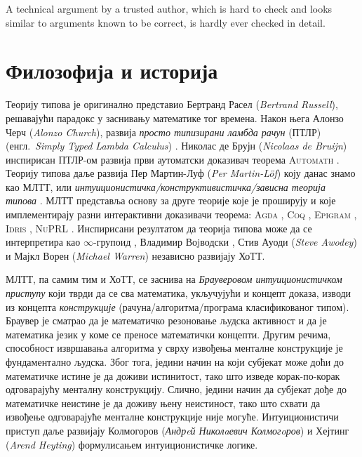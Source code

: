 \documentclass[12pt,oneside]{memoir}
\begin{document}
\begin{displayquote}
    A technical argument by a trusted author, which is hard to check and looks similar to arguments known to be correct, is hardly ever checked in detail.
\end{displayquote}

\section{Филозофија и историја}

Теорију типова је оригинално представио Бертранд Расел \cite{rus08} (\emph{Bertrand Russell}), решавајући парадокс у заснивању математике тог времена. Након њега Алонзо Черч (\emph{Alonzo Church}), развија \emph{просто типизирани ламбда рачун} (ПТЛР) (енгл.~\emph{Simply Typed Lambda Calculus}) \cite{crc40, crc41}. Николас де Брујн (\emph{Nicolaas de Bruijn}) инспирисан ПТЛР-ом развија први аутоматски доказивач теорема \textsc{Automath} \cite{automath}. Теорију типова даље развија Пер Мартин-Луф (\emph{Per Martin-Löf}) коју данас знамо као МЛТТ, или \emph{интуиционистичка/конструктивистичка/зависна теорија типова} \cite{pml75, pml82, pml84, pml98}. МЛТТ представља основу за друге теорије које је проширују и које имплементирају разни интерактивни доказивачи теорема: \textsc{Agda} \cite{agda}, \textsc{Coq} \cite{coq}, \textsc{Epigram} \cite{epigram}, \textsc{Idris} \cite{idris}, \textsc{NuPRL} \cite{nuprl}. Инспирисани резултатом да теорија типова може да се интерпретира као $\infty$-групоид \cite{hs98}, Владимир Воjводски \cite{vlad06}, Стив Ауоди (\emph{Steve Awodey}) и Мајкл Ворен (\emph{Michael Warren}) \cite{aw09} независно развијају ХоТТ.

МЛТТ, па самим тим и ХоТТ, се заснива на \emph{Брауверовом интуиционистичком приступу} \cite{brw} који тврди да се сва математика, укључујући и концепт доказа, изводи из концепта \emph{конструкције} (рачуна/алгоритма/програма класификованог типом). Браувер је сматрао да је математичко резоновање људска активност и да је математика језик у коме се преносе математички концепти. Другим речима, способност извршавања алгоритма у сврху извођења менталне конструкције је фундаментално људска. Због тога, једини начин на који субјекат може доћи до математичке истине је да доживи истинитост, тако што изведе корак-по-корак одговарајућу менталну конструкцију. Слично, једини начин да субјекат дође до математичке неистине је да доживу њену неистиност, тако што схвати да извођење одговарајуће менталне конструкције није могуће. Интуиционистичи приступ даље развијају Колмогоров (\emph{Андрeй Николaевич Колмогoров}) \cite{kol32} и Хејтинг (\emph{Arend Heyting}) \cite{hey} формулисањем интуиционистичке логике.
\end{document}
